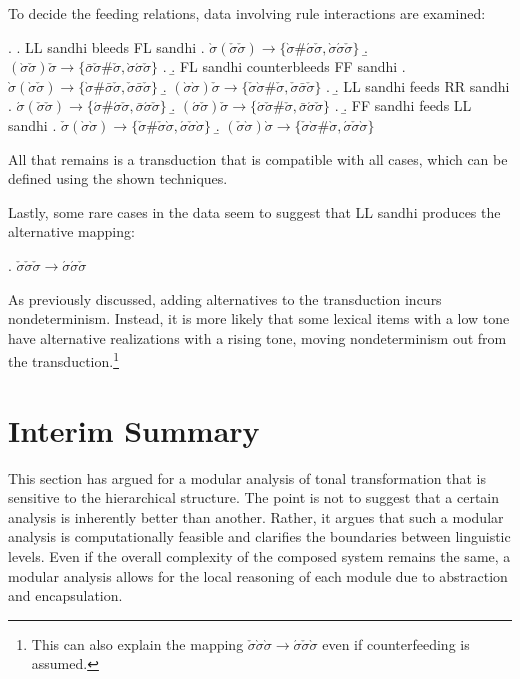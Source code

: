 \documentclass[12pt, a4paper]{report}
\begin{document}
To decide the feeding relations, data involving rule interactions are
examined:

\ex.
\a. LL sandhi bleeds FL sandhi
\a. \(\grave{\sigma}(\check{\sigma}\check{\sigma}) \to
\{\grave{\sigma}\#\acute{\sigma}\check{\sigma},
\grave{\sigma}\acute{\sigma}\check{\sigma}\}\)
\b. \((\grave{\sigma}\check{\sigma})\check{\sigma} \to
\{\bar{\sigma}\check{\sigma}\#\check{\sigma},
\grave{\sigma}\acute{\sigma}\check{\sigma}\}\)
%
\z.
\b. FL sandhi counterbleeds FF sandhi
\a. \(\grave{\sigma}(\grave{\sigma}\check{\sigma}) \to
\{\grave{\sigma}\#\bar{\sigma}\check{\sigma},
\check{\sigma}\bar{\sigma}\check{\sigma}\}\)
\b. \((\grave{\sigma}\grave{\sigma})\check{\sigma} \to
\{\check{\sigma}\grave{\sigma}\#\check{\sigma},
\check{\sigma}\bar{\sigma}\check{\sigma}\}\)
%
\z.
\b. LL sandhi feeds RR sandhi
\a. \(\acute{\sigma}(\check{\sigma}\check{\sigma}) \to
\{\acute{\sigma}\#\acute{\sigma}\check{\sigma},
\bar{\sigma}\acute{\sigma}\check{\sigma}\}\)
\b. \((\acute{\sigma}\check{\sigma})\check{\sigma} \to
\{\acute{\sigma}\check{\sigma}\#\check{\sigma},
\bar{\sigma}\acute{\sigma}\check{\sigma}\}\)
%
\z.
\b. FF sandhi feeds LL sandhi
\a. \(\check{\sigma}(\grave{\sigma}\grave{\sigma}) \to
\{\check{\sigma}\#\check{\sigma}\grave{\sigma},
\acute{\sigma}\check{\sigma}\grave{\sigma}\}\)
\b. \((\check{\sigma}\grave{\sigma})\grave{\sigma} \to
\{\check{\sigma}\grave{\sigma}\#\grave{\sigma},
\acute{\sigma}\check{\sigma}\grave{\sigma}\}\)

All that remains is a transduction that is compatible with all cases,
which can be defined using the shown techniques.


Lastly, some rare cases in the data seem to suggest that LL sandhi
produces the alternative mapping:

\ex. \(\check{\sigma}\check{\sigma}\check{\sigma} \to
\acute{\sigma}\acute{\sigma}\check{\sigma}\)

As previously discussed, adding alternatives to the transduction
incurs nondeterminism.  Instead, it is more likely that some lexical
items with a low tone have alternative realizations with a rising
tone, moving nondeterminism out from the transduction.\footnote{This
  can also explain the mapping
  \(\check{\sigma}\grave{\sigma}\grave{\sigma} \to
  \acute{\sigma}\check{\sigma}\grave{\sigma}\) even if counterfeeding
  is assumed.}

\section{Interim Summary}
This section has argued for a modular analysis of tonal transformation
that is sensitive to the hierarchical structure.  The point is not to
suggest that a certain analysis is inherently better than another.
Rather, it argues that such a modular analysis is computationally
feasible and clarifies the boundaries between linguistic levels.  Even
if the overall complexity of the composed system remains the same, a
modular analysis allows for the local reasoning of each module due to
abstraction and encapsulation.
\end{document}
